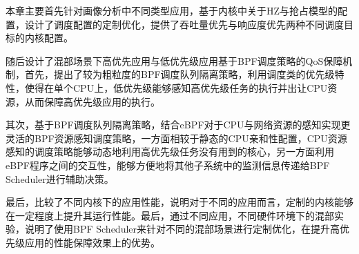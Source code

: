 本章主要首先针对画像分析中不同类型应用，基于内核中关于HZ与抢占模型的配置，设计了调度配置的定制优化，提供了吞吐量优先与响应度优先两种不同调度目标的内核配置。

随后设计了混部场景下高优先应用与低优先级应用基于BPF调度策略的QoS保障机制，首先，提出了较为粗粒度的BPF调度队列隔离策略，利用调度类的优先级特性，使得在单个CPU上，低优先级能够感知高优先级任务的执行并出让CPU资源，从而保障高优先级应用的执行。

其次，基于BPF调度队列隔离策略，结合eBPF对于CPU与网络资源的感知实现更灵活的BPF资源感知调度策略，一方面相较于静态的CPU亲和性配置，CPU资源感知的调度策略能够动态地利用高优先级任务没有用到的核心，另一方面利用eBPF程序之间的交互性，能够方便地将其他子系统中的监测信息传递给BPF Scheduler进行辅助决策。

最后，比较了不同内核下的应用性能，说明对于不同的应用而言，定制的内核能够在一定程度上提升其运行性能。最后，通过不同应用，不同硬件环境下的混部实验，说明了使用BPF Scheduler来针对不同的混部场景进行定制优化，在提升高优先级应用的性能保障效果上的优势。